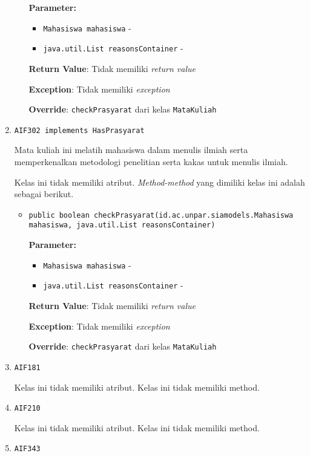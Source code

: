 \documentclass{article}
\begin{document}
\begin{enumerate}
\begin{itemize}
\textbf{Parameter:}
\begin{itemize}
\item \texttt{Mahasiswa mahasiswa} - 
\item \texttt{java.util.List reasonsContainer} - 
\end{itemize}
\textbf{Return Value}: Tidak memiliki \textit{return value}

\textbf{Exception}: Tidak memiliki \textit{exception}

\textbf{Override}: \texttt{checkPrasyarat} dari kelas \texttt{MataKuliah}

\end{itemize}
\item \texttt{AIF302 implements HasPrasyarat}

Mata kuliah ini melatih mahasiswa dalam menulis ilmiah serta memperkenalkan
 metodologi penelitian serta kakas untuk menulis ilmiah.

Kelas ini tidak memiliki atribut. \textit{Method-method} yang dimiliki kelas ini adalah sebagai berikut.
\begin{itemize}
\item \texttt{public boolean checkPrasyarat(id.ac.unpar.siamodels.Mahasiswa mahasiswa, java.util.List reasonsContainer)}



\textbf{Parameter:}
\begin{itemize}
\item \texttt{Mahasiswa mahasiswa} - 
\item \texttt{java.util.List reasonsContainer} - 
\end{itemize}
\textbf{Return Value}: Tidak memiliki \textit{return value}

\textbf{Exception}: Tidak memiliki \textit{exception}

\textbf{Override}: \texttt{checkPrasyarat} dari kelas \texttt{MataKuliah}

\end{itemize}
\item \texttt{AIF181}



Kelas ini tidak memiliki atribut. Kelas ini tidak memiliki method. \item \texttt{AIF210}



Kelas ini tidak memiliki atribut. Kelas ini tidak memiliki method. \item \texttt{AIF343}




\end{enumerate}
\end{document}
